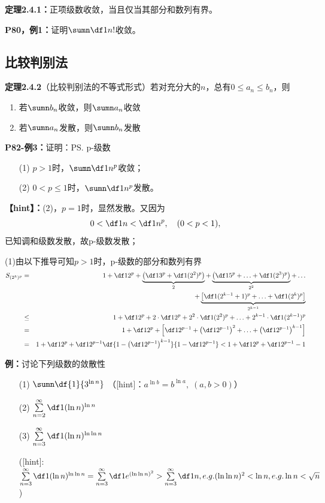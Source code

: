 {\bf 定理2.4.1：}正项级数收敛，当且仅当其部分和数列有界。

{\bf P80，例1：}证明$\sumn\df1{n!}$收敛。

\subsection{比较判别法}

{\bf 定理2.4.2}（比较判别法的不等式形式）若对充分大的$n$，总有$0\leq a_n\leq b_n$，则
\begin{enumerate}
  \setlength{\itemindent}{1cm}
  \item 若$\sumn b_n$收敛，则$\sumn a_n$收敛
  \item 若$\sumn a_n$发散，则$\sumn b_n$发散
\end{enumerate}

{\bf P82-例3：}证明：\ps{p-级数}
\begin{enumerate}[(1)]
  \setlength{\itemindent}{1cm}
  \item[(1)] $p>1$时，$\sumn\df1{n^p}$收敛；
  \item[(2)] $0<p\leq 1$时，$\sumn\df1{n^p}$发散。
\end{enumerate}

{\bf 【hint】：}(2)，$p=1$时，显然发散。又因为
$$0<\df 1n<\df 1{n^p},\quad (0<p<1),$$
已知调和级数发散，故p-级数发散；

(1)由以下推导可知$p>1$时，p-级数的部分和数列有界
\begin{eqnarray*}
	S_{(2^k)^p}&=&1+\df 1{2^p}+\underbrace{\left(\df1{3^p}+\df1{(2^2)^p}\right)}_2
				+\underbrace{\left(\df1{5^p}+\ldots+\df1{(2^3)^p}\right)}_{2^2}+\ldots\\
				&&+\underbrace{\left[\df1{(2^{k-1}+1)^p}+\ldots+\df1{(2^k)^p}\right]}_{2^{k-1}}\\
			  &\leq &1+\df 1{2^p}+2\cdot\df1{2^p}+2^2\cdot\df1{(2^2)^p}
			    +\ldots+2^{k-1}\cdot\df1{(2^{k-1})^p}\\
			  &=&1+\df 1{2^p}+\left[\df1{2^{p-1}}+\left(\df1{2^{p-1}}\right)^2+
			    \ldots+\left(\df1{2^{p-1}}\right)^{k-1}\right]\\
			  &=&1+\df 1{2^p}+\df1{2^{p-1}}\df{1-\left(\df1{2^{p-1}}\right)
			    ^{k-1}}{1-\df1{2^{p-1}}}<1+\df 1{2^p}+\df1{2^{p-1}-1}
\end{eqnarray*}

{\bf 例：}讨论下列级数的敛散性
\begin{enumerate}[(1)]
  \setlength{\itemindent}{1cm}
  \item[(1)] $\sumn\df{1}{3^{\ln n}}$
  \hfill（{[hint]：$a^{\ln b}=b^{\ln a},\;(a,b>0)$}）
  \item[(2)] $\sum\limits_{n=2}^{\infty}\df 1{(\ln n)^{\ln n}}$
  \item[(3)] $\sum\limits_{n=3}^{\infty}\df 1{(\ln n)^{\ln\ln n}}$
  
  ([hint]: $\sum\limits_{n=3}^{\infty}\df 1{(\ln n)^{\ln\ln n}}=
  \sum\limits_{n=3}^{\infty}\df 1{e^{(\ln\ln
  n)^2}}>\sum\limits_{n=3}^{\infty}\df 1n,e.g. (\ln\ln n)^2<\ln n,e.g. \ln
  n<\sqrt{n}$)
\end{enumerate}

